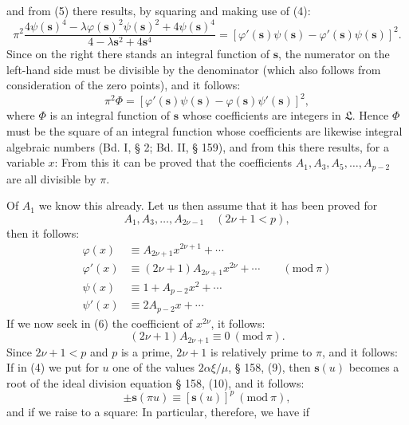 and from (5) there results, by squaring and making use of (4):
\[
\pi^2 \frac{4\psi(\boldsymbol{s})^4 - \lambda\varphi(\boldsymbol{s})^2\psi(\boldsymbol{s})^2 + 4\psi(\boldsymbol{s})^4}{4 - \lambda \boldsymbol{s}^2 + 4\boldsymbol{s}^4} = [\varphi'(\boldsymbol{s})\psi(\boldsymbol{s}) - \varphi'(\boldsymbol{s})\psi(\boldsymbol{s})]^2. %
\]
Since on the right there stands an integral function of $\boldsymbol{s}$, the numerator on the left-hand side must be divisible by the denominator (which also follows from consideration of the zero points), and it follows:
\[
\pi^2 \Phi = [\varphi'(\boldsymbol{s})\psi(\boldsymbol{s}) - \varphi(\boldsymbol{s})\psi'(\boldsymbol{s})]^2,
\]
where $\Phi$ is an integral function of $\boldsymbol{s}$ whose coefficients are integers in $\mathfrak{L}$. Hence $\Phi$ must be the square of an integral function whose coefficients are likewise integral algebraic numbers (Bd. I, § 2; Bd. II, § 159), and from this there results, for a variable $x$:
From this it can be proved that the coefficients $A_1, A_3, A_5, \ldots, A_{p-2}$ are all divisible by $\pi$.

Of $A_1$ we know this already. Let us then assume that it has been proved for
\[
A_1, A_3, \ldots, A_{2\nu-1} \quad (2\nu+1 < p),
\]
then it follows:
\[
\begin{aligned}
\varphi(x) &\equiv A_{2\nu+1}x^{2\nu+1} + \cdots\\
\varphi'(x) &\equiv (2\nu+1)A_{2\nu+1}x^{2\nu} + \cdots \qquad (\mathrm{mod}\ \pi)\\
\psi(x) &\equiv 1 + A_{p-2}x^2 + \cdots\\
\psi'(x) &\equiv 2A_{p-2}x + \cdots
\end{aligned}
\]
If we now seek in (6) the coefficient of $x^{2\nu}$, it follows:
\[
(2\nu+1)A_{2\nu+1} \equiv 0 \ (\mathrm{mod}\ \pi).
\]
Since $2\nu+1 < p$ and $p$ is a prime, $2\nu+1$ is relatively prime to $\pi$, and it follows:
If in (4) we put for $u$ one of the values $2\alpha\xi/\mu$, § 158, (9), then $\boldsymbol{s}(u)$ becomes a root of the ideal division equation § 158, (10), and it follows:
\[
\pm \boldsymbol{s}(\pi u) \equiv [\boldsymbol{s}(u)]^p \ (\mathrm{mod}\ \pi),
\]
and if we raise to a square:
In particular, therefore, we have
if
